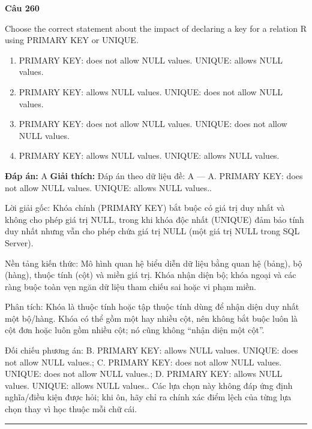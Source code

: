 \documentclass[11pt,a4paper]{article}
\newenvironment{question}[1]{%
  \par\vspace{1em}\noindent\textbf{\large Câu #1}\par\vspace{0.4em}
}{%
  \par\vspace{1em}\hrule\vspace{0.6em}
}
\newenvironment{choices}{%
  \begin{enumerate}[label=\textbf{\Alph*.},leftmargin=2.2em,itemsep=2pt,topsep=3pt]
}{%
  \end{enumerate}
}
\newcommand{\choice}{\item}
\begin{document}
\begin{question}{260}
Choose the correct statement about the impact of declaring a key for a relation R using PRIMARY KEY or UNIQUE.
\begin{choices}
\choice PRIMARY KEY: does not allow NULL values. UNIQUE: allows NULL values.
\choice PRIMARY KEY: allows NULL values. UNIQUE: does not allow NULL values.
\choice PRIMARY KEY: does not allow NULL values. UNIQUE: does not allow NULL values.
\choice PRIMARY KEY: allows NULL values. UNIQUE: allows NULL values.
\end{choices}
\textbf{Đáp án:} A
\textbf{Giải thích:} Đáp án theo dữ liệu đề: A — A. PRIMARY KEY: does not allow NULL values. UNIQUE: allows NULL values..

Lời giải gốc: Khóa chính (PRIMARY KEY) bắt buộc có giá trị duy nhất và không cho phép giá trị NULL, trong khi khóa độc nhất (UNIQUE) đảm bảo tính duy nhất nhưng vẫn cho phép chứa giá trị NULL (một giá trị NULL trong SQL Server).

Nền tảng kiến thức: Mô hình quan hệ biểu diễn dữ liệu bằng quan hệ (bảng), bộ (hàng), thuộc tính (cột) và miền giá trị. Khóa nhận diện bộ; khóa ngoại và các ràng buộc toàn vẹn ngăn dữ liệu tham chiếu sai hoặc vi phạm miền.

Phân tích: Khóa là thuộc tính hoặc tập thuộc tính dùng để nhận diện duy nhất một bộ/hàng. Khóa có thể gồm một hay nhiều cột, nên không bắt buộc luôn là cột đơn hoặc luôn gồm nhiều cột; nó cũng không “nhận diện một cột”.

Đối chiếu phương án: B. PRIMARY KEY: allows NULL values. UNIQUE: does not allow NULL values.; C. PRIMARY KEY: does not allow NULL values. UNIQUE: does not allow NULL values.; D. PRIMARY KEY: allows NULL values. UNIQUE: allows NULL values.. Các lựa chọn này không đáp ứng định nghĩa/điều kiện được hỏi; khi ôn, hãy chỉ ra chính xác điểm lệch của từng lựa chọn thay vì học thuộc mỗi chữ cái.
\end{question}
\end{document}
